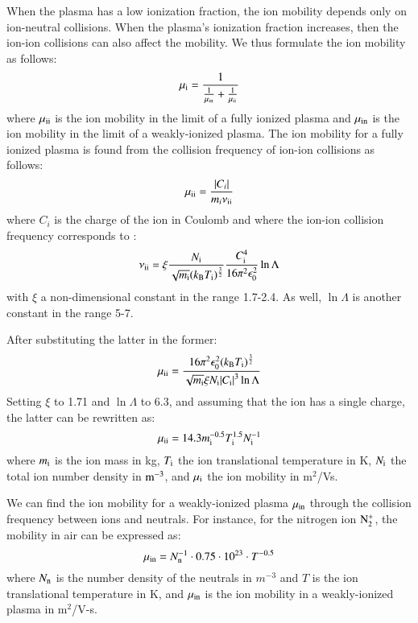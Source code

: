 \documentclass{warpdoc}
\newcommand{\mfd}{\displaystyle}
\begin{document}
When the plasma has a low ionization fraction, the ion mobility depends only on ion-neutral collisions. When the plasma's ionization fraction increases, then the ion-ion collisions can also affect the mobility. We thus formulate the ion mobility as follows:
%
\begin{equation}
\mu_{\rm i}=\frac{1}{\frac{1}{\mu_{\rm in}}+\frac{1}{\mu_{\rm ii}}}
\end{equation}
%
where $\mu_{\rm ii}$ is the ion mobility in the limit of a fully ionized plasma and $\mu_{\rm in}$ is the ion mobility in the limit of a weakly-ionized plasma. The ion mobility for a fully ionized plasma is found from the collision frequency of ion-ion collisions as follows:
%
\begin{equation}
 \mu_{\rm ii} = \frac{|C_i|}{m_i \nu_{\rm ii}}
\end{equation}
% 
where $C_i$ is the charge of the ion in Coulomb and where the ion-ion collision frequency corresponds to \cite{book:1984:chen}:
%
\begin{equation}
\nu_{\rm ii}=\xi \frac{ N_{\rm i}}{ \sqrt{m_{\rm i}} (k_{\rm B} T_{\rm i})^\frac{3}{2}}  \frac{C_{\rm i}^4}{16 \pi^2 \epsilon_0^2}  \ln \Lambda
\end{equation}
%
with $\xi$ a non-dimensional constant in the range 1.7-2.4. As well, $\ln \Lambda$ is another constant in the range 5-7.


After substituting the latter in the former:
%
\begin{equation}
 \mu_{\rm ii} = \frac{16 \pi^2 \epsilon_0^2 (k_{\rm B} T_{\rm i})^\frac{3}{2}}{\mfd \sqrt{m_{\rm i}} \xi  N_{\rm i}  |C_{\rm i}|^3  \ln \Lambda}
\end{equation}
% 
Setting $\xi$ to 1.71 and $\ln \Lambda$ to 6.3, and assuming that the ion has a single charge, the latter can be rewritten as:
%
\begin{equation}
 \mu_{\rm ii} = 14.3 m_{\rm i}^{-0.5} T_{\rm i}^{1.5} N_{\rm i}^{-1}
\end{equation}
% 
where $m_{\rm i}$ is the ion mass in kg, $T_{\rm i}$ the ion translational temperature in K, $N_{\rm i}$ the total ion number density in $\rm m^{-3}$, and $\mu_{\rm i}$ the ion mobility in m$^2$/Vs.


We can find the ion mobility for a weakly-ionized plasma $\mu_{\rm in}$ through the collision frequency between ions and neutrals. For instance, for the nitrogen ion $\rm N_2^+$, the mobility in air can be expressed as:
%
\begin{equation}
\mu_{\rm in}=N_{\rm n}^{-1} \cdot 0.75\cdot 10^{23}\cdot T^{-0.5}
\end{equation}
%
where $N_{\rm n}$ is the number density of the neutrals in $m^{-3}$ and $T$ is the ion translational temperature in K, and $\mu_{\rm in}$ is the ion mobility in a weakly-ionized plasma in m$^2$/V-s.
\end{document}
